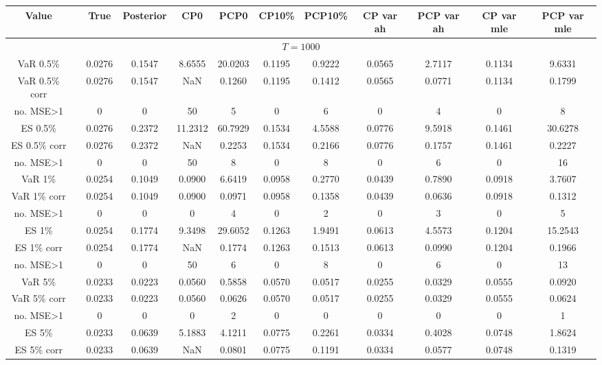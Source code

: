 { \renewcommand{\arraystretch}{1.2} 
\begin{sidewaystable} 
\center 
\begin{tabular}{cc cc cccc cccc} 
Value && True & Posterior & CP0  & PCP0 & CP10\%  & PCP10\% &CP var ah & PCP var ah & CP var mle & PCP var mle \\ \hline 
\hline 
\multicolumn{12}{c}{$T =1000$}  \\ 
\hline 
VaR 0.5\% && 0.0276 & 0.1547 & 8.6555 & 20.0203 & 0.1195 & 0.9222 &0.0565 & 2.7117 & 0.1134 & 9.6331 \\ 
VaR 0.5\% corr && 0.0276 & 0.1547 &    NaN & 0.1260 & 0.1195 & 0.1412 &0.0565 & 0.0771 & 0.1134 & 0.1799 \\ 
no. MSE>1 && 0 & 0 & 50 & 5 & 0 & 6 &0 & 4 & 0 & 8 \\[1ex] 
ES 0.5\% && 0.0276 & 0.2372 & 11.2312 & 60.7929 & 0.1534 & 4.5588 &0.0776 & 9.5918 & 0.1461 & 30.6278 \\ 
ES 0.5\% corr && 0.0276 & 0.2372 &    NaN & 0.2253 & 0.1534 & 0.2166 &0.0776 & 0.1757 & 0.1461 & 0.2227 \\ 
no. MSE>1 && 0 & 0 & 50 & 8 & 0 & 8 &0 & 6 & 0 & 16 \\[1.5ex] 
VaR 1\% && 0.0254 & 0.1049 & 0.0900 & 6.6419 & 0.0958 & 0.2770 &0.0439 & 0.7890 & 0.0918 & 3.7607 \\ 
VaR 1\% corr && 0.0254 & 0.1049 & 0.0900 & 0.0971 & 0.0958 & 0.1358 &0.0439 & 0.0636 & 0.0918 & 0.1312 \\ 
no. MSE>1 && 0 & 0 & 0 & 4 & 0 & 2 &0 & 3 & 0 & 5 \\[1ex] 
ES 1\% && 0.0254 & 0.1774 & 9.3498 & 29.6052 & 0.1263 & 1.9491 &0.0613 & 4.5573 & 0.1204 & 15.2543 \\ 
ES 1\% corr && 0.0254 & 0.1774 &    NaN & 0.1774 & 0.1263 & 0.1513 &0.0613 & 0.0990 & 0.1204 & 0.1966 \\ 
no. MSE>1 && 0 & 0 & 50 & 6 & 0 & 8 &0 & 6 & 0 & 13 \\[1.5ex] 
VaR 5\% && 0.0233 & 0.0223 & 0.0560 & 0.5858 & 0.0570 & 0.0517 &0.0255 & 0.0329 & 0.0555 & 0.0920 \\ 
VaR 5\% corr && 0.0233 & 0.0223 & 0.0560 & 0.0626 & 0.0570 & 0.0517 &0.0255 & 0.0329 & 0.0555 & 0.0624 \\ 
no. MSE>1 && 0 & 0 & 0 & 2 & 0 & 0 &0 & 0 & 0 & 1 \\[1ex] 
ES 5\% && 0.0233 & 0.0639 & 5.1883 & 4.1211 & 0.0775 & 0.2261 &0.0334 & 0.4028 & 0.0748 & 1.8624 \\ 
ES 5\% corr && 0.0233 & 0.0639 &    NaN & 0.0801 & 0.0775 & 0.1191 &0.0334 & 0.0577 & 0.0748 & 0.1319 \\ 

\end{tabular}
\end{sidewaystable}}
